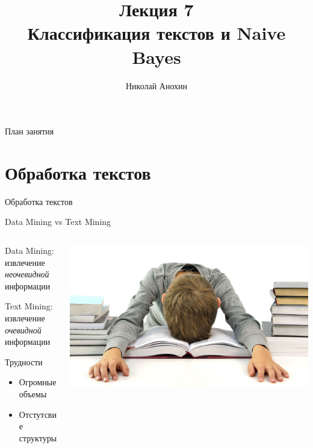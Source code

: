 \documentclass[10pt]{beamer}
\author{Николай Анохин}
\title{\newline \newline \newline Лекция 7 \\ Классификация текстов и Naive Bayes}
\let\otp\titlepage
\renewcommand{\titlepage}{\otp\addtocounter{framenumber}{-1}}
\begin{document}
\begin{frame}[plain]
\titlepage
\end{frame}

\begin{frame}{План занятия}
\tableofcontents
\end{frame}


\section{Обработка текстов}


\begin{frame}{}

\begin{center}
\Large Обработка текстов
\end{center}

\end{frame}

\begin{frame}{Data Mining vs Text Mining}

	\begin{columns}[T]
    \begin{column}{.5\textwidth}
   	Data Mining: \\ извлечение {\it неочевидной} информации

	\vspace{1em}
	Text Mining: \\ извлечение {\it очевидной} информации

\vspace{1em}
Трудности
\begin{itemize}
\item Огромные объемы
\item Отстутсвие структуры
\end{itemize}
	    
    \end{column}
    \begin{column}{.5\textwidth}
    \vspace{1em}
    \includegraphics[scale=0.06]{images/books.jpg}    
    \end{column}
  \end{columns}

\end{frame}
\end{document}
